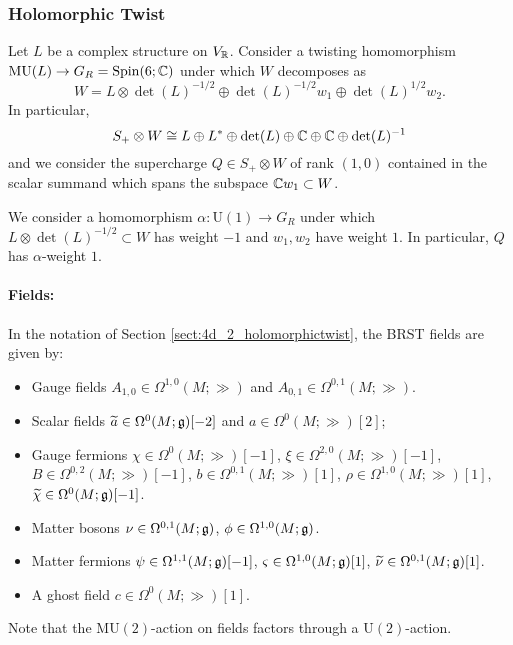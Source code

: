 \documentclass[10pt, oneside]{article}
\newcommand{\MU}{\mathrm{MU}}
\renewcommand{\U}{\mathrm{U}}
\begin{document}
\subsubsection{Holomorphic Twist}
\label{sect:4d4holomorphictwist}

Let $L$ be a complex structure on $V_\RR$. Consider a twisting homomorphism $\MU(L)\rightarrow G_R=\Spin(6; \CC)$ under which $W$ decomposes as
\[W = L\otimes \det(L)^{-1/2}\oplus \det(L)^{-1/2} w_1\oplus \det(L)^{1/2} w_2.\]
In particular,
\[S_+\otimes W\cong L\oplus L^*\oplus \det(L)\oplus \CC \oplus \CC\oplus \det(L)^{-1}\]
and we consider the supercharge $Q\in S_+\otimes W$ of rank $(1, 0)$ contained in the scalar summand which spans the subspace $\CC w_1\subset W$.

We consider a homomorphism $\alpha\colon \U(1)\rightarrow G_R$ under which $L\otimes \det(L)^{-1/2}\subset W$ has weight $-1$ and $w_1,w_2$ have weight $1$. In particular, $Q$ has $\alpha$-weight $1$.

\vspace{-10pt}
\paragraph{Fields:} In the notation of Section \ref{sect:4d_2_holomorphictwist}, the BRST fields are given by:
\begin{itemize}
\item Gauge fields $A_{1, 0}\in\Omega^{1, 0}(M; \gg)$ and $A_{0, 1}\in\Omega^{0, 1}(M; \gg)$.
\item Scalar fields $\Tilde{a} \in \Omega^{0}(M; \gg)[-2]$ and $a \in\Omega^{0}(M; \gg)[2]$;
\item Gauge fermions $\chi \in \Omega^0(M ; \gg)[-1]$, $\xi \in \Omega^{2,0}(M ; \gg)[-1]$, $B \in \Omega^{0,2}(M ; \gg)[-1]$, $b \in \Omega^{0,1}(M ; \gg)[1]$, $\rho \in \Omega^{1,0}(M ; \gg)[1]$,  $\Tilde{\chi} \in \Omega^0(M ; \gg)[-1]$.
\item Matter bosons $\nu\in\Omega^{0, 1}(M; \fg)$, $\phi\in\Omega^{1,0}(M; \fg)$.
\item Matter fermions $\psi \in \Omega^{1,1} (M;  \fg)[-1]$, $\varsigma \in \Omega^{1,0} (M ; \fg)[1]$, $\Tilde{\nu} \in \Omega^{0,1}(M; \fg)[1]$.
\item A ghost field $c\in \Omega^0(M; \gg)[1]$.
\end{itemize}

Note that the $\MU(2)$-action on fields factors through a $\U(2)$-action.
\end{document}
